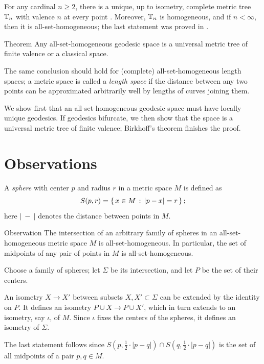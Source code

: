 \documentclass[leqno,a4paper,10pt]{article}
\begin{document}
For any cardinal $n\ge2$, there is a unique, up to isometry,
complete metric tree $\mathbb{T}_n$ with valence $n$ at every point \cite{dyubina-polterovich}.
Moreover, $\mathbb{T}_n$ is homogeneous, and if $n<\infty$, then it is all-set-homogeneous; the last statement was proved in \cite{lebedeva-petrunin2024}.

\begin{thm}{Theorem}\label{thm:main}
Any all-set-homogeneous geodesic space is a universal metric tree of finite valence or a classical space.
\end{thm}

The same conclusion should hold for (complete) all-set-homogeneous length spaces;
a metric space is called a \emph{length space} if the distance between any two points can be approximated arbitrarily well by lengths of curves joining them.

We show first that an all-set-homogeneous geodesic space must have locally unique geodesics.
If geodesics bifurcate, we then show that the space is a universal metric tree of finite valence;
Birkhoff's theorem finishes the proof.

\section{Observations}

A \emph{sphere} with center $p$ and radius $r$ in a metric space $M$ is defined as
\[S(p,r)=\left\{\,{x\in M}\,:\,{|p-x|=r}\,\right\};\]
here $|\ -\ |$ denotes the distance between points in $M$.

\begin{thm}{Observation}\label{obs:spheres}
The intersection of an arbitrary family of spheres in an all-set-homogeneous metric space $M$ is all-set-homogeneous.
In particular, the set of midpoints of any pair of points in $M$ is all-set-homogeneous.
\end{thm}

Choose a family of spheres;
let $\Sigma$ be its intersection, and let $P$ be the set of their centers.

An isometry $X \to X'$ between subsets $X,X'\subset \Sigma$ can be extended by the identity on $P$.
It defines an isometry $P\cup X\to P\cup X'$,
which in turn extends to an isometry, say $\iota$, of $M$.
Since $\iota$ fixes the centers of the spheres, it defines an isometry of $\Sigma$.

The last statement follows since $S(p,\tfrac12\cdot|p-q|)\cap S(q,\tfrac12\cdot|p-q|)$ is the set of all midpoints of a pair $p,q\in M$.
\qeds
\end{document}

